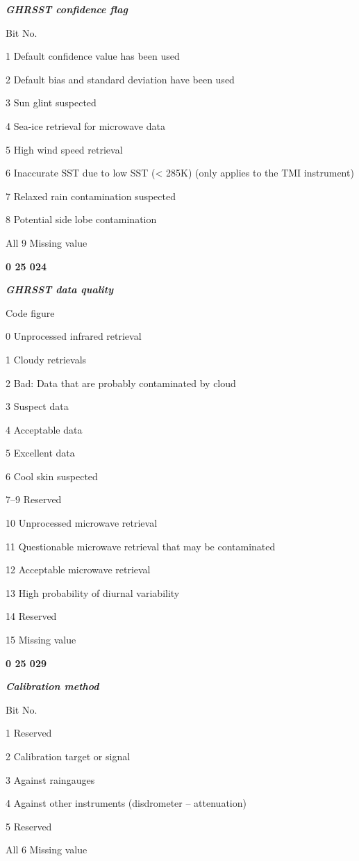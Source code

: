 \emph{\textbf{GHRSST confidence flag}}

Bit No.

1 Default confidence value has been used

2 Default bias and standard deviation have been used

3 Sun glint suspected

4 Sea-ice retrieval for microwave data

5 High wind speed retrieval

6 Inaccurate SST due to low SST (\textless{} 285K) (only applies to the TMI instrument)

7 Relaxed rain contamination suspected

8 Potential side lobe contamination

All 9 Missing value

\textbf{0 25 024}

\emph{\textbf{GHRSST data quality}}

Code figure

0 Unprocessed infrared retrieval

1 Cloudy retrievals

2 Bad: Data that are probably contaminated by cloud

3 Suspect data

4 Acceptable data

5 Excellent data

6 Cool skin suspected

7--9 Reserved

10 Unprocessed microwave retrieval

11 Questionable microwave retrieval that may be contaminated

12 Acceptable microwave retrieval

13 High probability of diurnal variability

14 Reserved

15 Missing value

\textbf{0 25 029}

\emph{\textbf{Calibration method}}

Bit No.

1 Reserved

2 Calibration target or signal

3 Against raingauges

4 Against other instruments (disdrometer -- attenuation)

5 Reserved

All 6 Missing value

